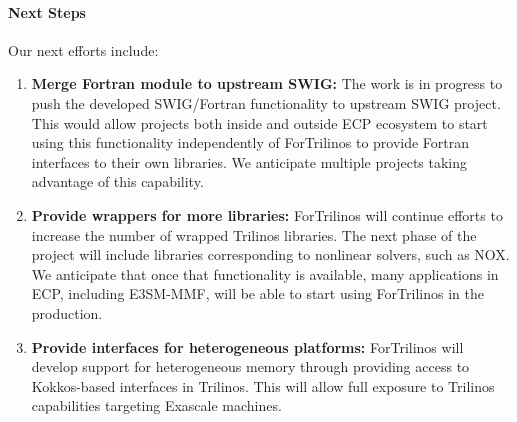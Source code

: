 \paragraph{Next Steps}

Our next efforts include:
\begin{enumerate}
  \item \textbf{Merge Fortran module to upstream SWIG:} The work is in progress
    to push the developed SWIG/Fortran functionality to upstream SWIG project.
    This would allow projects both inside and outside ECP ecosystem to start using
    this functionality independently of ForTrilinos to provide Fortran
    interfaces to their own libraries. We anticipate multiple projects taking
    advantage of this capability.
  \item \textbf{Provide wrappers for more libraries:} ForTrilinos will continue
    efforts to increase the number of wrapped Trilinos libraries. The next phase
    of the project will include libraries corresponding to nonlinear solvers,
    such as NOX. We anticipate that once that functionality is available, many
    applications in ECP, including E3SM-MMF, will be able to start using ForTrilinos in the
    production.
  \item \textbf{Provide interfaces for heterogeneous platforms:} ForTrilinos
    will develop support for heterogeneous memory through providing access to
    Kokkos-based interfaces in Trilinos. This will allow full exposure to
    Trilinos capabilities targeting Exascale machines.
\end{enumerate}
